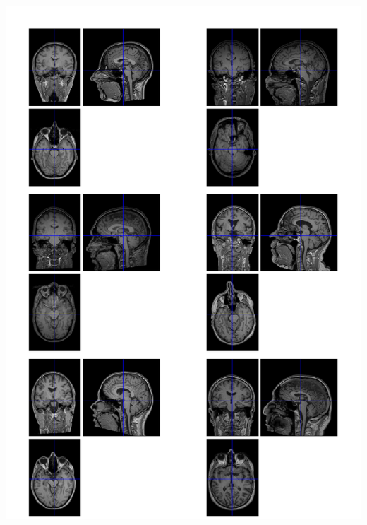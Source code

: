\documentclass{beamer}
\begin{document}
\begin{frame}
\begin{columns}[c]
\includegraphics[width=\textwidth]{original_images}
\end{columns}
\end{frame}
\end{document}
